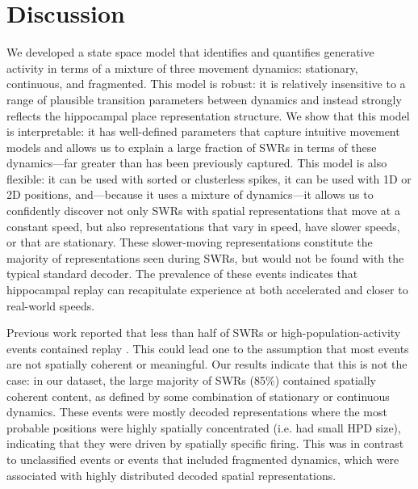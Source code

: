 \documentclass[9pt,lineno]{elife}
\begin{document}
\section*{Discussion}
We developed a state space model that identifies and quantifies generative activity in terms of a mixture of three movement dynamics: stationary, continuous, and fragmented. This model is robust: it is relatively insensitive to a range of plausible transition parameters between dynamics and instead strongly reflects the hippocampal place representation structure. We show that this model is interpretable: it has well-defined parameters that capture intuitive movement models and allows us to explain a large fraction of SWRs in terms of these dynamics---far greater than has been previously captured. This model is also flexible: it can be used with sorted or clusterless spikes, it can be used with 1D or 2D positions, and---because it uses a mixture of dynamics---it allows us to confidently discover not only SWRs with spatial representations that move at a constant speed, but also representations that vary in speed, have slower speeds, or that are stationary. These slower-moving representations constitute the majority of representations seen during SWRs, but would not be found with the typical standard decoder. The prevalence of these events indicates that hippocampal replay can recapitulate experience at both accelerated and closer to real-world speeds.

Previous work reported that less than half of SWRs or high-population-activity events contained replay \citep{KarlssonAwakereplayremote2009, FosterReversereplaybehavioural2006, DavidsonHippocampalReplayExtended2009}. This could lead one to the assumption that most events are not spatially coherent or meaningful. Our results indicate that this is not the case: in our dataset, the large majority of SWRs (85\%) contained spatially coherent content, as defined by some combination of stationary or continuous dynamics. These events were mostly decoded representations where the most probable positions were highly spatially concentrated (i.e. had small HPD size), indicating that they were driven by spatially specific firing. This was in contrast to unclassified events or events that included fragmented dynamics, which were associated with highly distributed decoded spatial representations.
\end{document}
